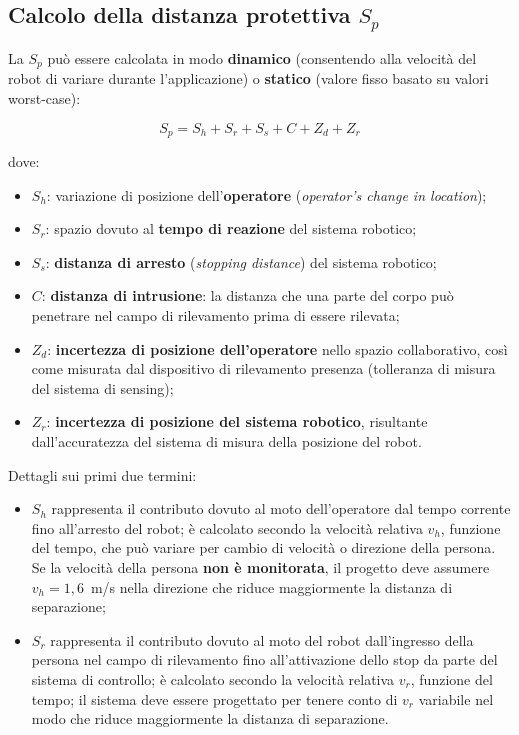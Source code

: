 \subsection{Calcolo della distanza protettiva $S_p$}
La $S_p$ può essere calcolata in modo \textbf{dinamico} (consentendo alla velocità del robot di variare durante l'applicazione) o \textbf{statico} (valore fisso basato su valori worst-case):
\begin{key}
\[ S_p = S_h + S_r + S_s + C + Z_d + Z_r \]
\end{key}
dove:
\begin{itemize}
    \item $S_h$: variazione di posizione dell'\textbf{operatore} (\emph{operator's change in location});
    \item $S_r$: spazio dovuto al \textbf{tempo di reazione} del sistema robotico;
    \item $S_s$: \textbf{distanza di arresto} (\emph{stopping distance}) del sistema robotico;
    \item $C$: \textbf{distanza di intrusione}: la distanza che una parte del corpo può penetrare nel campo di rilevamento prima di essere rilevata;
    \item $Z_d$: \textbf{incertezza di posizione dell'operatore} nello spazio collaborativo, così come misurata dal dispositivo di rilevamento presenza (tolleranza di misura del sistema di sensing);
    \item $Z_r$: \textbf{incertezza di posizione del sistema robotico}, risultante dall'accuratezza del sistema di misura della posizione del robot.
\end{itemize}

Dettagli sui primi due termini:
\begin{itemize}
    \item $S_h$ rappresenta il contributo dovuto al moto dell'operatore dal tempo corrente fino all'arresto del robot; è calcolato secondo la velocità relativa $v_h$, funzione del tempo, che può variare per cambio di velocità o direzione della persona. Se la velocità della persona \textbf{non è monitorata}, il progetto deve assumere $v_h = 1{,}6$~m/s nella direzione che riduce maggiormente la distanza di separazione;
    \item $S_r$ rappresenta il contributo dovuto al moto del robot dall'ingresso della persona nel campo di rilevamento fino all'attivazione dello stop da parte del sistema di controllo; è calcolato secondo la velocità relativa $v_r$, funzione del tempo; il sistema deve essere progettato per tenere conto di $v_r$ variabile nel modo che riduce maggiormente la distanza di separazione.
\end{itemize}


